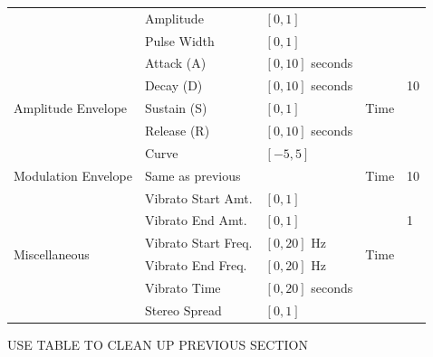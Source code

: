 \documentclass[11pt, oneside]{report}   	%
\begin{document}
\begin{table}[]
\begin{tabular}{|l|l|l|l|l|}
																	  & Amplitude               	& $[0, 1]$                   		&                       			&\\
																	  & Pulse Width                & $[0, 1]$                   		&                       			&\\ \hline
		\multirow{5}{*}{Amplitude Envelope}    & Attack (A)       				& $[0, 10]$ seconds        & \multirow{5}{*}{Time}& \multirow{3}{*}{10} \\
																	  & Decay (D)               		& $[0, 10]$ seconds         &                       			&\\
																	  & Sustain (S)             	 	 & $[0, 1]$                   		&                       			&\\
																	  & Release (R)             		& $[0, 10]$ seconds        &                       			&\\
																	  & Curve                   	   	   & $[-5, 5]$                  	&                       			&\\ \hline
		Modulation Envelope        						& Same as previous           &                            			& Time              	& 10									\\ \hline
		\multirow{6}{*}{Miscellaneous}             & Vibrato Start Amt.    		  & $[0, 1]$                   	& \multirow{6}{*}{Time}& \multirow{3}{*}{1} \\
																	  & Vibrato End Amt.	         & $[0, 1]$                   		&                       			&\\
																	  & Vibrato Start Freq.			  & $[0, 20]$ Hz               &                       			&\\
																	  & Vibrato End Freq.		      & $[0, 20]$ Hz               &                       			&\\
																	  & Vibrato Time            		& $[0, 20]$ seconds      &                       			&\\
																	  & Stereo Spread           	  & $[0, 1]$                   		&                       			&\\ \hline
	\end{tabular}
\end{table}

USE TABLE TO CLEAN UP PREVIOUS SECTION
\end{document}
